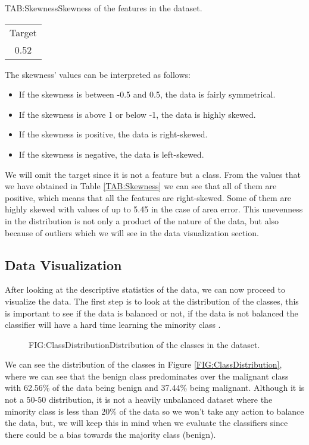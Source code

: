 \begin{table}[Skewness]{TAB:Skewness}{Skewness of the features in the dataset.}
\begin{adjustbox}{width=1\linewidth}
\begin{tabular}{|c|c|c|c|c|c|}
            \multicolumn{6}{|c|}{Target} \\
            \multicolumn{6}{|c|}{0.52} \\
            \hline
        \end{tabular}
    \end{adjustbox}

\end{table}

The skewness' values can be interpreted as follows:
\begin{itemize}
    \item If the skewness is between -0.5 and 0.5, the data is fairly symmetrical.
    \item If the skewness is above 1 or below -1, the data is highly skewed.
    \item If the skewness is positive, the data is right-skewed.
    \item If the skewness is negative, the data is left-skewed.
\end{itemize}

We will omit the target since it is not a feature but a class. From the values that we have obtained in Table \ref{TAB:Skewness} we can see that all of them are positive, which means that all the features are right-skewed. Some of them are highly skewed with values of up to 5.45 in the case of area error. This unevenness in the distribution is not only a product of the nature of the data, but also because of outliers which we will see in the data visualization section.

\subsection{Data Visualization}

After looking at the descriptive statistics of the data, we can now proceed to visualize the data. The first step is to look at the distribution of the classes, this is important to see if the data is balanced or not, if the data is not balanced the classifier will have a hard time learning the minority class \cite{he_learning_2009}.

\begin{figure}[Class Distribution]{FIG:ClassDistribution}{Distribution of the classes in the dataset.}
\end{figure}

We can see the distribution of the classes in Figure \ref{FIG:ClassDistribution}, where we can see that the benign class predominates over the malignant class with 62.56\% of the data being benign and 37.44\% being malignant. Although it is not a 50-50 distribution, it is not a heavily unbalanced dataset where the minority class is less than 20\% of the data so we won't take any action to balance the data, but, we will keep this in mind when we evaluate the classifiers since there could be a bias towards the majority class (benign).

